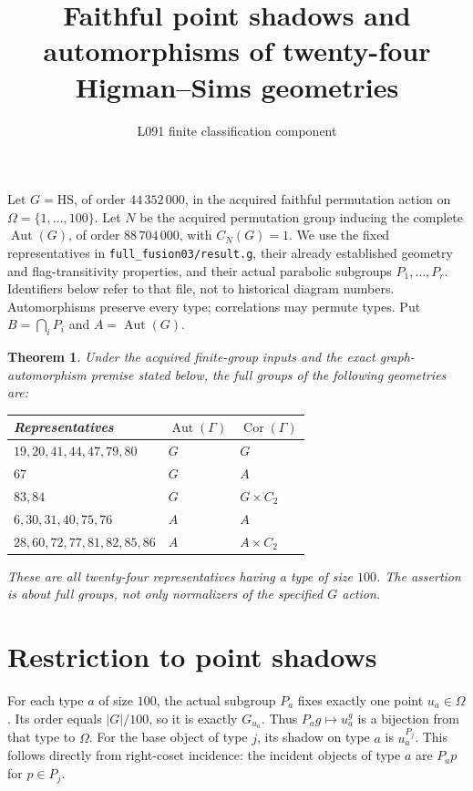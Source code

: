 \documentclass[11pt]{article}
\title{Faithful point shadows and automorphisms of twenty-four Higman--Sims geometries}
\author{L091 finite classification component}\date{}
\newtheorem{theorem}[lemma]{Theorem}
\newcommand{\Aut}{\operatorname{Aut}}
\newcommand{\Cor}{\operatorname{Cor}}
\newcommand{\HS}{\mathrm{HS}}
\begin{document}
\maketitle
Let $G=\HS$, of order $44\,352\,000$, in the acquired faithful
permutation action on $\Omega=\{1,\ldots,100\}$. Let $N$ be the
acquired permutation group inducing the complete $\Aut(G)$, of order
$88\,704\,000$, with $C_N(G)=1$. We use the fixed representatives
in \texttt{full\_fusion03/result.g}, their already established geometry
and flag-transitivity properties, and their actual parabolic subgroups
$P_1,\ldots,P_r$. Identifiers below refer to that file, not to historical
diagram numbers. Automorphisms preserve every type; correlations may
permute types. Put $B=\bigcap_iP_i$ and $A=\Aut(G)$.

\begin{theorem}\label{main}
Under the acquired finite-group inputs and the exact graph-automorphism
premise stated below, the full groups of the following geometries are:
\begin{center}\small
\begin{tabular}{lll}\toprule
Representatives&$\Aut(\Gamma)$&$\Cor(\Gamma)$\\\midrule
$19,20,41,44,47,79,80$&$G$&$G$\\
$67$&$G$&$A$\\
$83,84$&$G$&$G\times C_2$\\
$6,30,31,40,75,76$&$A$&$A$\\
$28,60,72,77,81,82,85,86$&$A$&$A\times C_2$\\\bottomrule
\end{tabular}
\end{center}
These are all twenty-four representatives having a type of size $100$.
The assertion is about full groups, not only normalizers of the specified
$G$ action.
\end{theorem}

\section*{Restriction to point shadows}
For each type $a$ of size $100$, the actual subgroup $P_a$ fixes exactly
one point $u_a\in\Omega$. Its order equals $|G|/100$, so it is exactly
$G_{u_a}$. Thus $P_ag\mapsto u_a^g$ is a bijection from that type to
$\Omega$. For the base object of type $j$, its shadow on type $a$ is
$u_a^{P_j}$. This follows directly from right-coset incidence:
the incident objects of type $a$ are $P_ap$ for $p\in P_j$.
\end{document}
